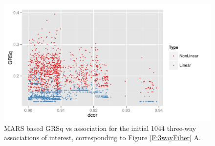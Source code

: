 \documentclass[a4paper, 12pt]{report}
\begin{document}
\begin{figure}[H]
\begin{centering}
\includegraphics[width=\textwidth]{grsqVdcor3way.pdf}
\caption{MARS based GRSq vs association for the initial 1044 three-way associations of interest, corresponding to Figure \ref{F:3wayFilter} A.} 
\label{F:GRSqvAssociation3way}
\end{centering}
\end{figure}

\end{document}
